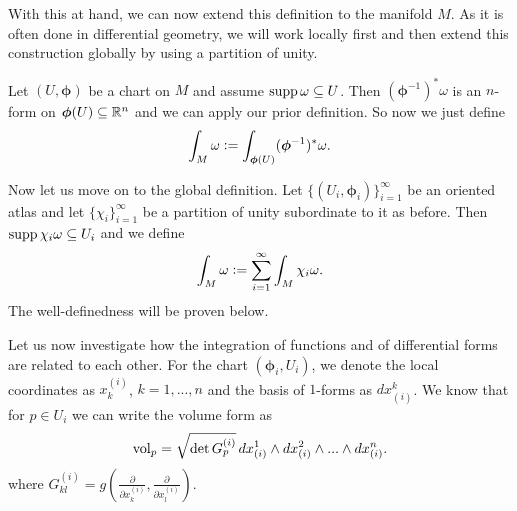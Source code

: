 \documentclass[../master_thesis.tex]{subfiles}
\begin{document}
With this at hand, we can now extend this definition to 
the manifold $M$. As it is often done in 
differential geometry, we will work locally first and then extend this 
construction globally by using a partition of unity.

Let $(U,\boldsymbol{\phi})$ be a chart on $M$ and assume $\operatorname{supp} \omega \subseteq U$. 
Then $(\boldsymbol{\phi}^{-1})^* \omega$
is an $n$-form on $\boldsymbol{\phi}(U) \subseteq \mathbb{R}^n$ and 
we can apply our prior definition. So now we just define 
\begin{align*}
    \int_M \omega \vcentcolon= \int_{\boldsymbol{\phi}(U)} (\boldsymbol{\phi}^{-1})^* \omega.
\end{align*}

Now let us move on to the global definition. Let $\{(U_i,\boldsymbol{\phi}_i)\}_{i=1}^\infty$
be an oriented atlas and let $\{ \chi_i \}_{i=1}^\infty$ be a partition 
of unity subordinate to it as before. 
Then $\operatorname{supp} \chi_i \omega \subseteq U_i$ 
and we define 
\begin{align*}
    \int_M \omega \vcentcolon= \sum_{i=1}^\infty \int_M \chi_i \omega.
\end{align*} 
The well-definedness will be proven below.

Let us now investigate how the integration of functions and of 
differential forms are related to each other. 
For the chart $(\boldsymbol{\phi}_i, U_i)$, we denote the local coordinates as 
$x^{(i)}_k$, $k=1,...,n$ and the basis of $1$-forms as $dx_{(i)}^k$.
We know that for $p \in U_i$ we can write the volume form as
\begin{align*}
    \operatorname{vol}_p = \sqrt{ \det G_p^{(i)}} \,
        dx_{(i)}^1 \wedge dx_{(i)}^2 \wedge ... \wedge dx_{(i)}^n.
\end{align*}
where $G^{(i)}_{kl} = g(\frac{\partial}{\partial x^{(i)}_k},\frac{\partial}{\partial x^{(i)}_l} )$.
\end{document}
